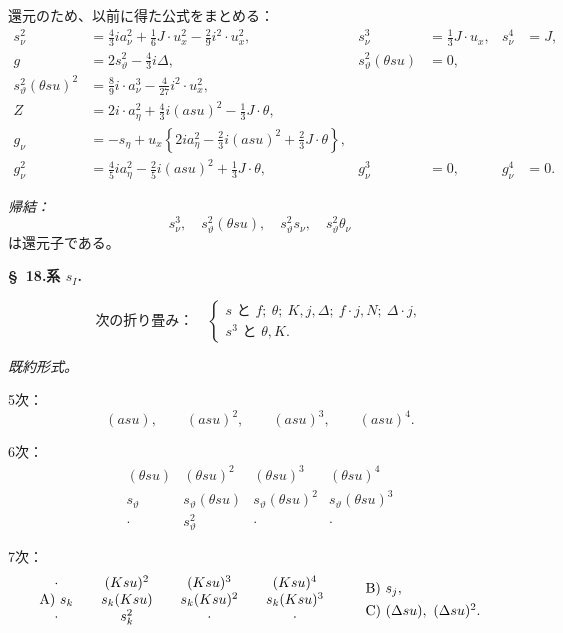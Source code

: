 \documentclass[11pt]{article}
\newcommand{\A}{\Delta}
\begin{document}
還元のため、以前に得た公式をまとめる：
\[
\tag{24}
\begin{aligned}
s_\nu^2&=\frac43ia_\nu^2+\frac16J\cdot u_x^2-\frac29i^2\cdot u_x^2,
& s_\nu^3&=\frac13J\cdot u_x,
& s_\nu^4&=J,\\[0.3em]
g&=2s_\vartheta^2-\frac43i\A,
& s_\vartheta^2(\theta su)&=0,\\[0.3em]
s_\vartheta^2(\theta su)^2&=\frac89i\cdot a_\nu^3-\frac4{27}i^2\cdot u_x^2,\\[0.3em]
Z&=2i\cdot a_\eta^2+\frac43i(asu)^2-\frac13J\cdot\theta,\\[0.3em]
g_\nu&=-s_\eta+u_x\left\{2ia_\eta^2-\frac23i(asu)^2+\frac23J\cdot\theta\right\},\\[0.3em]
g_\nu^2&=\frac45ia_\eta^2-\frac25i(asu)^2+\frac13J\cdot\theta,
&g_\nu^3&=0,
&g_\nu^4&=0.
\end{aligned}
\]

\noindent\emph{帰結：}
\[
 s_\nu^3,
\quad s_\vartheta^2(\theta su),
\quad s_\vartheta^2s_\nu,
\quad s_\vartheta^2\theta_\nu
\]
は還元子である。



\clearpage
\begin{center}
\textbf{\S\ 18.\quad 系 $s_I$.}
\end{center}

\[
\text{次の折り畳み：}\quad
\left\{\begin{array}{l}
s\text{ と } f;\ \theta;\ K,j,\A;\ f\cdot j,N;\ \A\cdot j,\\
s^3\text{ と }\theta,K.
\end{array}\right.
\]

\noindent\emph{既約形式。}

\noindent 5次：
\[
(asu),\qquad (asu)^2,\qquad (asu)^3,\qquad (asu)^4.
\]

\noindent 6次：
\[
\begin{array}{cccc}
(\theta su)&(\theta su)^2&(\theta su)^3&(\theta su)^4\\
s_\vartheta&s_\vartheta(\theta su)&s_\vartheta(\theta su)^2&s_\vartheta(\theta su)^3\\
\cdot&s_\vartheta^2&\cdot&\cdot
\end{array}
\]

\noindent 7次：
\[
\begin{array}{c@{\qquad}c@{\qquad}c@{\qquad}c}
\cdot&(Ksu)^2&(Ksu)^3&(Ksu)^4\\
\text{A)}\ s_k&s_k(Ksu)&s_k(Ksu)^2&s_k(Ksu)^3\\
\cdot&s_k^2&\cdot&\cdot
\end{array}
\qquad
\begin{array}{l}
\text{B)}\ s_j,\\[0.4em]
\text{C)}\ (\A su),\ (\A su)^2.
\end{array}
\]
\end{document}
